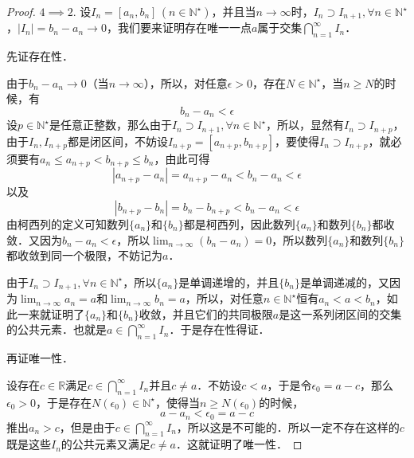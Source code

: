 \documentclass{ctexart}
\theoremstyle{definition}
\theoremstyle{definition}
\theoremstyle{plain}
\theoremstyle{plain}
\theoremstyle{plain}
\theoremstyle{definition}
\newcommand{\nat}{\mathbb{N}^\star}
\begin{document}
\begin{proof}
$4 \implies 2$.
设$I_n = [a_n,b_n]\,(n \in \nat)$，并且当$n\to\infty$时，$I_n \supset I_{n+1}, \forall n \in \nat$，$|I_n| = b_n - a_n \to 0$，我们要来证明存在唯一一点$a$属于交集$\displaystyle\bigcap_{n=1}^\infty I_n$．

\noindent 先证存在性．

\noindent 由于$b_n - a_n \to 0$（当$n\to\infty$），所以，对任意$\epsilon > 0$，存在$N \in \nat$，当$n \geq N$的时候，有
\begin{equation}
    b_n - a_n < \epsilon
\end{equation}
设$p \in \nat$是任意正整数，那么由于$I_n \supset I_{n+1}, \forall n \in \nat$，所以，显然有$I_n \supset I_{n+p}$，由于$I_n, I_{n+p}$都是闭区间，不妨设$I_{n+p} = [a_{n+p},b_{n+p}]$，要使得$I_n \supset I_{n+p}$，就必须要有$a_n \leq a_{n+p} < b_{n+p} \leq b_n$，由此可得
\begin{equation}
    |a_{n+p} - a_n | = a_{n+p} - a_n < b_n - a_n < \epsilon
\end{equation}
以及
\begin{equation}
    |b_{n+p} - b_n | = b_n - b_{n+p} < b_n - a_n < \epsilon
\end{equation}
由柯西列的定义可知数列$\{a_n\}$和$\{b_n\}$都是柯西列，因此数列$\{a_n\}$和数列$\{b_n\}$都收敛．又因为$b_n - a_n < \epsilon$，所以$\displaystyle\lim_{n\to\infty}(b_n-a_n)=0$，所以数列$\{a_n\}$和数列$\{b_n\}$都收敛到同一个极限，不妨记为$a$．

\noindent 由于$I_n \supset I_{n+1},\forall n \in \nat$，所以$\{a_n\}$是单调递增的，并且$\{b_n\}$是单调递减的，又因为$\displaystyle\lim_{n\to\infty}a_n=a$和$\displaystyle\lim_{n\to\infty}b_n=a$，所以，对任意$n \in \nat$恒有$a_n < a < b_n$，如此一来就证明了$\{a_n\}$和$\{b_n\}$收敛，并且它们的共同极限$a$是这一系列闭区间的交集的公共元素．也就是$a \in \displaystyle\bigcap_{n=1}^\infty I_n$．于是存在性得证．

\noindent 再证唯一性．

\noindent 设存在$c \in \mathbb{R}$满足$c \in \displaystyle\bigcap_{n=1}^\infty I_n$并且$c \neq a$．不妨设$c < a$，于是令$\epsilon_0 = a - c$，那么$\epsilon_0 > 0$，于是存在$N(\epsilon_0) \in \nat$，使得当$n \geq N(\epsilon_0)$的时候，
\begin{equation}
    a - a_n < \epsilon_0 = a - c
\end{equation}
推出$a_n > c$，但是由于$c \in \displaystyle\bigcap_{n=1}^\infty I_n$，所以这是不可能的．所以一定不存在这样的$c$既是这些$I_n$的公共元素又满足$c \neq a$．这就证明了唯一性．
\end{proof}
\end{document}
